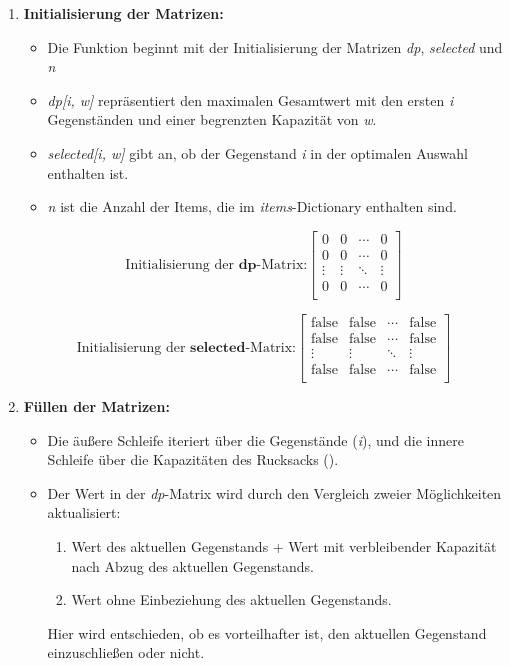 \begin{enumerate}
    \item \textbf{Initialisierung der Matrizen:}
    \begin{itemize}
        \item Die Funktion beginnt mit der Initialisierung der Matrizen \textit{dp}, \textit{selected} und \textit{n}
        \item \textit{dp[i, w]} repräsentiert den maximalen Gesamtwert mit den ersten \textit{i} Gegenständen und einer begrenzten Kapazität von \textit{w}.
        \item \textit{selected[i, w]} gibt an, ob der Gegenstand \textit{i} in der optimalen Auswahl enthalten ist.
        \item \textit{n} ist die Anzahl der Items, die im \textit{items}-Dictionary enthalten sind.
    \end{itemize}

    \[
        \text{Initialisierung der }\textbf{dp}\text{-Matrix:}
        \begin{bmatrix}
            0 & 0 & \cdots & 0 \\
            0 & 0 & \cdots & 0 \\
            \vdots & \vdots & \ddots & \vdots \\
            0 & 0 & \cdots & 0 \\
        \end{bmatrix}
    \]

    \[
        \text{Initialisierung der }\textbf{selected}\text{-Matrix:}
        \begin{bmatrix}
            \text{false} & \text{false} & \cdots & \text{false} \\
            \text{false} & \text{false} & \cdots & \text{false} \\
            \vdots & \vdots & \ddots & \vdots \\
            \text{false} & \text{false} & \cdots & \text{false} \\
        \end{bmatrix}
    \]

    \item \textbf{Füllen der Matrizen:}
    \begin{itemize}
        \item Die äußere Schleife iteriert über die Gegenstände (\textit{i}), und die innere Schleife über die Kapazitäten des Rucksacks ().
        \item Der Wert in der \textit{dp}-Matrix wird durch den Vergleich zweier Möglichkeiten aktualisiert:
        \begin{enumerate}
            \item Wert des aktuellen Gegenstands + Wert mit verbleibender Kapazität nach Abzug des aktuellen Gegenstands.
            \item Wert ohne Einbeziehung des aktuellen Gegenstands.\\
        \end{enumerate}
        Hier wird entschieden, ob es vorteilhafter ist, den aktuellen Gegenstand einzuschließen oder nicht.
    \end{itemize}


\end{enumerate}
